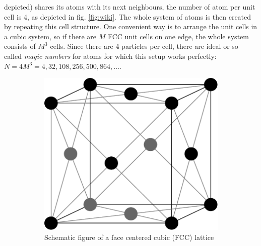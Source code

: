 \documentclass[12pt]{article}
\begin{document}
depicted) shares its atoms with its next neighbours, the number of atom per unit cell is 4, as depicted in fig. \ref{fig:wiki}. The whole system of
atoms is then created by repeating this cell structure. One convenient way is to arrange the unit cells in a cubic system, so if there are $M$ FCC
unit cells on one edge, the whole system consists of $M^3$ cells. Since there are 4 particles per cell, there are ideal or so called \textit{magic
numbers} for atoms for which this setup works perfectly: $N = 4M^3 = 4,32,108,256,500,864,\ldots$.\\
\begin{figure}[h]
    \begin{center}
        \begin{subfigure}[t]{0.3\textwidth}
            \includegraphics[scale=0.3]{images/fcc-2.pdf}
            \caption{Schematic figure of a face centered cubic (FCC) lattice}
            \label{fig:fcc}
        \end{subfigure} 
        \
        \begin{subfigure}[t]{0.3\textwidth}

\end{subfigure}
\end{center}
\end{figure}
\end{document}
